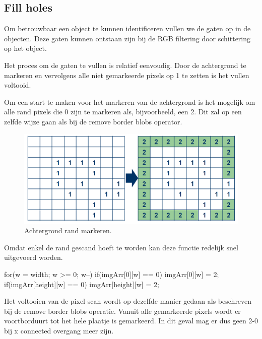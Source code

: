 \subsection{Fill holes}

Om betrouwbaar een object te kunnen identificeren vullen we de gaten op in de
objecten. Deze gaten kunnen ontstaan zijn bij de RGB filtering door schittering
op het object.

Het proces om de gaten te vullen is relatief eenvoudig. Door de achtergrond te
markeren en vervolgens alle niet gemarkeerde pixels op 1 te zetten is het vullen
voltooid.

Om een start te maken voor het markeren van de achtergrond is het mogelijk om
alle rand pixels die 0 zijn te markeren als, bijvoorbeeld, een 2. Dit zal op een
zelfde wijze gaan als bij de remove border blobs operator.

\begin{figure}
    \begin{center}
        \includegraphics[scale=0.35]{figures/fill_holes_step1.png}
    \end{center}
    \caption{Achtergrond rand markeren.}
    \label{fig:fhstep1}
\end{figure}

Omdat enkel de rand gescand hoeft te worden kan deze functie redelijk snel
uitgevoerd worden.

\begin{cppcode}
    for(w = width; w >= 0; w--){
        if(imgArr[0][w] == 0){
            imgArr[0][w] = 2;
        }
        if(imgArr[height][w] == 0){
            imgArr[height][w] = 2;
        }
    }
\end{cppcode}

Het voltooien van de pixel scan wordt op dezelfde manier gedaan als beschreven
bij de remove border blobs operatie. Vanuit alle gemarkeerde pixels wordt er
voortborduurt tot het hele plaatje is gemarkeerd. In dit geval mag er dus geen
2-0 bij x connected overgang meer zijn.

